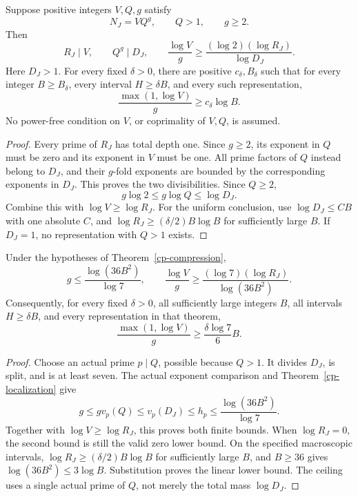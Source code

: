 \begin{theorem}
\label{cp-compression}
Suppose positive integers \(V,Q,g\) satisfy
\[
 N_J=VQ^g,\qquad Q>1,\qquad g\ge2.
\]
Then
\[
 R_J\mid V,\qquad Q^g\mid D_J,\qquad
 \frac{\log V}{g}\ge
     \frac{(\log2)(\log R_J)}{\log D_J}.
\]
Here \(D_J>1\). For every fixed \(\delta>0\), there are positive
\(c_\delta,B_\delta\) such that for every integer \(B\ge B_\delta\),
every interval \(H\ge\delta B\), and every such representation,
\[
 \frac{\max(1,\log V)}g\ge c_\delta\log B.
\]
No power-free condition on \(V\), or coprimality of \(V,Q\), is assumed.
\end{theorem}
\begin{proof}
Every prime of \(R_J\) has total depth one. Since \(g\ge2\), its
exponent in \(Q\) must be zero and its exponent in \(V\) must be one.
All prime factors of \(Q\) instead belong to \(D_J\), and their
\(g\)-fold exponents are bounded by the corresponding exponents in
\(D_J\). This proves the two divisibilities. Since \(Q\ge2\),
\[
 g\log2\le g\log Q\le\log D_J.
\]
Combine this with \(\log V\ge\log R_J\). For the uniform conclusion,
use \(\log D_J\le CB\) with one absolute \(C\), and
\(\log R_J\ge(\delta/2)B\log B\) for sufficiently large \(B\).
If \(D_J=1\), no representation with \(Q>1\) exists.
\end{proof}

\begin{theorem}
\label{cp-linear-obstruction}
Under the hypotheses of Theorem~\ref{cp-compression},
\[
 g\le\frac{\log(36B^2)}{\log7},\qquad
 \frac{\log V}{g}\ge
       \frac{(\log7)(\log R_J)}{\log(36B^2)}.
\]
Consequently, for every fixed \(\delta>0\), all sufficiently large
integers \(B\), all intervals \(H\ge\delta B\), and every representation
in that theorem,
\[
 \frac{\max(1,\log V)}g\ge\frac{\delta\log7}{6}B.
\]
\end{theorem}
\begin{proof}
Choose an actual prime \(p\mid Q\), possible because \(Q>1\).
It divides \(D_J\), is split, and is at least seven. The actual exponent
comparison and Theorem~\ref{cp-localization} give
\[
 g\le g v_p(Q)\le v_p(D_J)\le h_p
             \le\frac{\log(36B^2)}{\log7}.
\]
Together with \(\log V\ge\log R_J\), this proves both finite bounds.
When \(\log R_J=0\), the second bound is still the valid zero lower
bound. On the specified macroscopic intervals,
\(\log R_J\ge(\delta/2)B\log B\) for sufficiently large \(B\), and
\(B\ge36\) gives \(\log(36B^2)\le3\log B\). Substitution proves the
linear lower bound. The ceiling uses a single actual prime of \(Q\),
not merely the total mass \(\log D_J\).
\end{proof}


